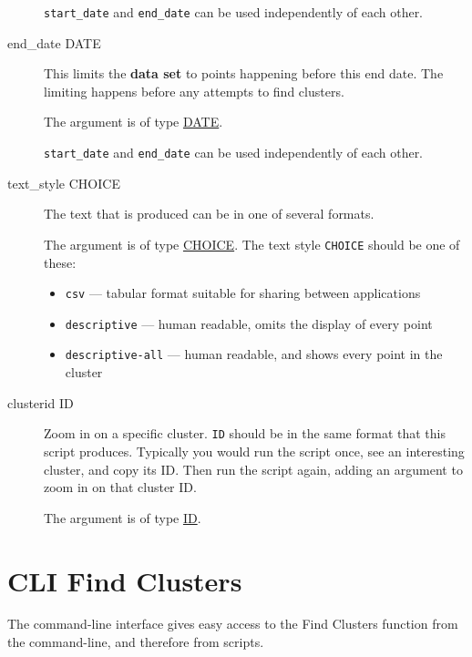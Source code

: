 \begin{description}
\verb=start_date= and \verb=end_date= can be used independently of
each other.

\item[end\_date DATE]
\hypertarget{cluster-end-date}{}

This limits the \textbf{data set} to points happening before this end
date. The limiting happens before any attempts to find clusters.

The argument is of type \hyperlink{argument-type-date}{DATE}.

\verb=start_date= and \verb=end_date= can be used independently of
each other.

\item[text\_style CHOICE]
\hypertarget{cluster-text-style}{}

The text that is produced can be in one of several formats.

The argument is of type \hyperlink{argument-type-choice}{CHOICE}. The text
style \verb=CHOICE= should be one of these:

\begin{itemize}
\item \verb=csv= --- tabular format suitable for sharing between applications
\item \verb=descriptive= --- human readable, omits the display of every point
\item \verb=descriptive-all= --- human readable, and shows every point in the cluster
\end{itemize}


\item[clusterid ID]
\hypertarget{cluster-clusterid}{}

Zoom in on a specific cluster. \verb=ID= should be in the same format
that this script produces. Typically you would run the script once,
see an interesting cluster, and copy its ID. Then run the script
again, adding an argument to zoom in on that cluster ID.

The argument is of type \hyperlink{argument-type-id}{ID}.


\end{description}


\section{CLI Find Clusters}

The command-line interface gives easy access to the Find Clusters function
from the command-line, and therefore from scripts.

